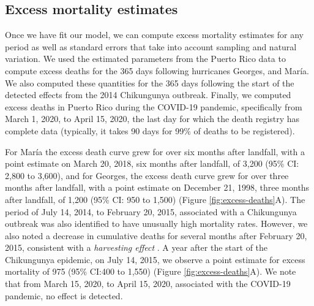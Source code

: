 \documentclass[11pt]{article}
\begin{document}
\subsection{Excess mortality estimates}
\label{subsec:excess-mortality}
Once we have fit our model, we can compute excess mortality estimates for any period as well as standard errors that take into account sampling and natural variation. We used the estimated parameters from the Puerto Rico data to compute excess deaths for the 365 days following hurricanes Georges, and Mar\'ia. We also computed these quantities for the 365 days following the start of the detected effects from the 2014 Chikungunya outbreak. Finally, we computed excess deaths in Puerto Rico during the COVID-19 pandemic, specifically from March 1, 2020, to April 15, 2020, the last day for which the death registry has complete data (typically, it takes 90 days for 99\% of deaths to be registered).

For Mar\'ia the excess death curve grew for over six months after landfall, with a point estimate on March 20, 2018, six months after landfall, of 3,200 (95\% CI: 2,800 to 3,600), and for Georges, the excess death curve grew for over three months after landfall, with a point estimate on December 21, 1998, three months after landfall, of 1,200 (95\% CI: 950 to 1,500) (Figure \ref{fig:excess-deaths}A). The period of July 14, 2014, to February 20, 2015, associated with a Chikungunya outbreak was also identified to have unusually high mortality rates. However, we also noted a decrease in cumulative deaths for several months after February 20, 2015, consistent with a \emph{harvesting effect} \cite{hajat2005mortality, dushoff2006mortality}. A year after the start of the Chikungunya epidemic, on July 14, 2015, we observe a point estimate for excess mortality of 975 (95\% CI:400 to 1,550) (Figure \ref{fig:excess-deaths}A). We note that from March 15, 2020, to April 15, 2020, associated with the COVID-19 pandemic, no effect is detected.
\end{document}
